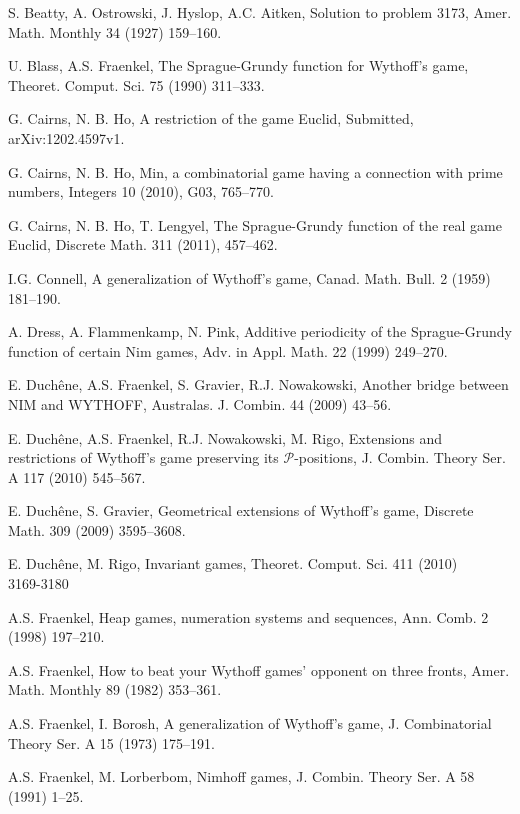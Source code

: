 \documentclass[12pt]{amsart}
\theoremstyle{plain}
\theoremstyle{definition}
\theoremstyle{remark}
\begin{document}
\begin{thebibliography}{19}

 S. Beatty, A. Ostrowski, J. Hyslop, A.C. Aitken, Solution to problem 3173, Amer. Math. Monthly 34 (1927) 159--160.

 U. Blass, A.S. Fraenkel, The {S}prague-{G}rundy function for {W}ythoff's game, Theoret. Comput. Sci. 75 (1990) 311--333.

 G. Cairns, N. B. Ho, A restriction of the game Euclid, Submitted, arXiv:1202.4597v1.

 G. Cairns, N. B. Ho, Min, a combinatorial game having a connection with prime numbers, Integers 10 (2010), G03, 765--770.

 G. Cairns, N. B. Ho, T. Lengyel, The Sprague-Grundy function of the real game Euclid, Discrete Math. 311 (2011), 457--462.

 I.G. Connell, A generalization of {W}ythoff's game, Canad. Math. Bull. 2 (1959) 181--190.

 A. Dress, A. Flammenkamp, N. Pink, Additive periodicity of the {S}prague-{G}rundy function of certain {N}im games, Adv. in Appl. Math. 22 (1999) 249--270.

 E. Duch{\^e}ne, A.S. Fraenkel, S. Gravier, R.J. Nowakowski, Another bridge between NIM and WYTHOFF, Australas. J. Combin. 44 (2009) 43--56.

 E. Duch{\^e}ne,  A.S. Fraenkel, R.J. Nowakowski, M. Rigo, Extensions and restrictions of {W}ythoff's game preserving its ${\mathcal{P}}$-positions, J. Combin. Theory Ser. A 117 (2010) 545--567.

 E. Duch{\^e}ne, S. Gravier, Geometrical extensions of Wythoff's game, Discrete Math. 309 (2009) 3595--3608.

 E. Duch{\^e}ne, M. Rigo, Invariant games, Theoret. Comput. Sci. 411 (2010) 3169-3180

 A.S. Fraenkel, Heap games, numeration systems and sequences, Ann. Comb. 2 (1998) 197--210.

 A.S. Fraenkel, How to beat your Wythoff games' opponent on three fronts, Amer. Math. Monthly 89 (1982)  353--361.

 A.S. Fraenkel, I. Borosh, A generalization of Wythoff's game, J. Combinatorial Theory Ser. A 15 (1973) 175--191.

 A.S. Fraenkel, M. Lorberbom, Nimhoff games, J. Combin. Theory Ser. A 58 (1991) 1--25.


\end{thebibliography}
\end{document}
